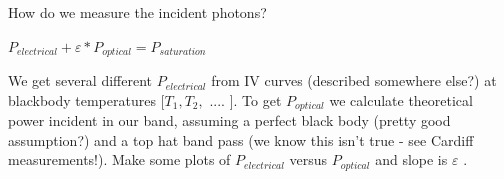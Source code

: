 How do we measure the incident photons?

$P_{electrical} + \varepsilon*P_{optical} = P_{saturation}$

We get several different $P_{electrical}$ from IV curves (described somewhere else?) at blackbody  temperatures [$T_{1}, T_{2},$ .... ]. To get $P_{optical}$ we calculate theoretical power incident in our band, assuming a perfect black body (pretty good assumption?) and a top hat band pass (we know this isn't true - see Cardiff measurements!). Make some plots of $P_{electrical}$  versus $P_{optical}$ and slope is $\varepsilon$ .



%
%
